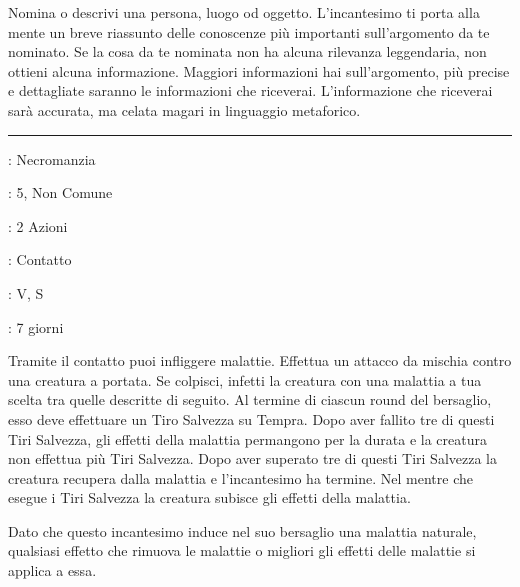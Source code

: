 \begin{multicols}{2}
Nomina o descrivi una persona, luogo od oggetto. L'incantesimo ti porta alla mente un breve riassunto delle conoscenze più importanti sull'argomento da te nominato. Se la cosa da te nominata non ha alcuna rilevanza leggendaria, non ottieni alcuna informazione. Maggiori informazioni hai sull'argomento, più precise e dettagliate saranno le informazioni che riceverai. L'informazione che riceverai sarà accurata, ma celata magari in linguaggio metaforico.

\smallskip\noindent\rule{\linewidth}{2pt} \hypertarget{Contagio}{}\medskip{}
\noindent
\begin{description}[noitemsep, topsep=0pt, parsep=0pt, partopsep=0pt, leftmargin=0cm, labelwidth=2.8cm]
	\item[\textbf{Lista di Magia}]: Necromanzia
	\item[\textbf{Livello}]: 5, Non Comune
	\item[\textbf{T. di Lancio}]: 2 Azioni
	\item[\textbf{Gittata}]: Contatto
	\item[\textbf{Componenti}]: V, S
	\item[\textbf{Durata}]: 7 giorni
\end{description}

Tramite il contatto puoi infliggere malattie. Effettua un attacco da mischia contro una creatura a portata. Se colpisci, infetti la creatura con una malattia a tua scelta tra quelle descritte di seguito. Al termine di ciascun round del bersaglio, esso deve effettuare un Tiro Salvezza su Tempra. Dopo aver fallito tre di questi Tiri Salvezza, gli effetti della malattia permangono per la durata e la creatura non effettua più Tiri Salvezza. Dopo aver superato tre di questi Tiri Salvezza la creatura recupera dalla malattia e l'incantesimo ha termine. Nel mentre che esegue i Tiri Salvezza la creatura subisce gli effetti della malattia.

Dato che questo incantesimo induce nel suo bersaglio una malattia naturale, qualsiasi effetto che rimuova le malattie o migliori gli effetti delle malattie si applica a essa.


\end{multicols}
